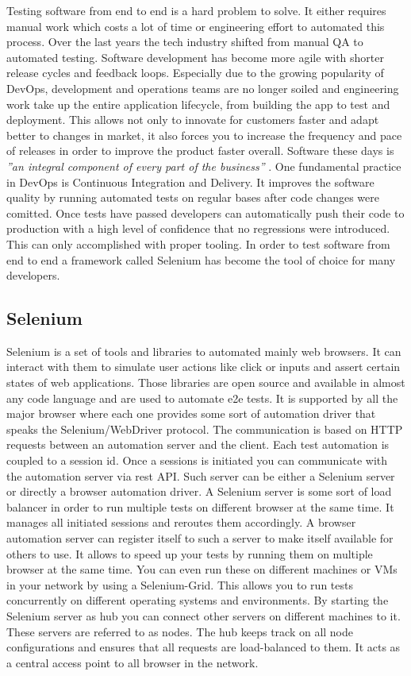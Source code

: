 Testing software from end to end is a hard problem to solve. It either requires manual work
which costs a lot of time or engineering effort to automated this process. Over the last
years the tech industry shifted from manual QA to automated testing. Software development
has become more agile with shorter release cycles and feedback loops. Especially due to the
growing popularity of DevOps, development and operations teams are no longer soiled and
engineering work take up the entire application lifecycle, from building the app to test and
deployment. This allows not only to innovate for customers faster and adapt better to changes
in market, it also forces you to increase the frequency and pace of releases in order to
improve the product faster overall. Software these days is \textit{''an integral component
of every part of the business''} \cite{devops}. One fundamental practice in DevOps is
Continuous Integration and Delivery. It improves the software quality by running automated
tests on regular bases after code changes were comitted. Once tests have passed developers
can automatically push their code to production with a high level of confidence that no
regressions were introduced. This can only accomplished with proper tooling. In order to test
software from end to end a framework called Selenium has become the tool of choice for many
developers.

\subsection{Selenium\label{sec:history}}

Selenium is a set of tools and libraries to automated mainly web browsers. It can interact
with them to simulate user actions like click or inputs and assert certain states of web
applications. Those libraries are open source and available in almost any code language and
are used to automate e2e tests. It is supported by all the major browser where each one
provides some sort of automation driver that speaks the Selenium/WebDriver protocol. The
communication is based on HTTP requests between an automation server and the client. Each
test automation is coupled to a session id. Once a sessions is initiated you can communicate
with the automation server via rest API. Such server can be either a Selenium server or directly
a browser automation driver. A Selenium server is some sort of load balancer in order to run
multiple tests on different browser at the same time. It manages all initiated sessions and
reroutes them accordingly. A browser automation server can register itself to such a server
to make itself available for others to use. It allows to speed up your tests by running them
on multiple browser at the same time. You can even run these on different machines or VMs in
your network by using a Selenium-Grid. This allows you to run tests concurrently on different
operating systems and environments. By starting the Selenium server as hub you can connect other
servers on different machines to it. These servers are referred to as nodes. The hub keeps
track on all node configurations and ensures that all requests are load-balanced to them. It
acts as a central access point to all browser in the network.

